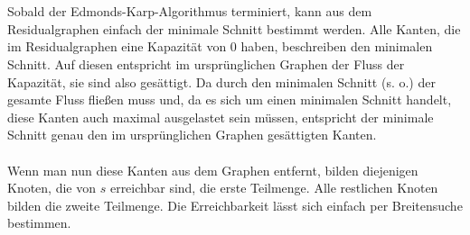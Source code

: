 \documentclass[a4paper, notitlepage, 12pt]{scrartcl}
\begin{document}
\\ \\
Sobald der Edmonds-Karp-Algorithmus terminiert, kann aus dem Residualgraphen einfach der minimale Schnitt bestimmt werden. Alle Kanten, die im Residualgraphen eine Kapazität von 0 haben, beschreiben den minimalen Schnitt. Auf diesen entspricht im ursprünglichen Graphen der Fluss der Kapazität, sie sind also \glqq gesättigt\grqq . Da durch den minimalen Schnitt (s. o.) der gesamte Fluss fließen muss und, da es sich um einen minimalen Schnitt handelt, diese Kanten auch maximal ausgelastet sein müssen, entspricht der minimale Schnitt genau den im ursprünglichen Graphen gesättigten Kanten.
\\ \\
Wenn man nun diese Kanten aus dem Graphen entfernt, bilden diejenigen Knoten, die von $s$ erreichbar sind, die erste Teilmenge. Alle restlichen Knoten bilden die zweite Teilmenge. Die Erreichbarkeit lässt sich einfach per Breitensuche bestimmen.
\end{document}
